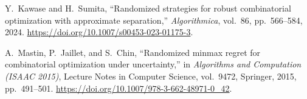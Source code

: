 Y.~Kawase and H.~Sumita, ``Randomized strategies for robust combinatorial
optimization with approximate separation,'' \emph{Algorithmica}, vol.~86,
pp.~566--584, 2024. \url{https://doi.org/10.1007/s00453-023-01175-3}.

A.~Mastin, P.~Jaillet, and S.~Chin, ``Randomized minmax regret for
combinatorial optimization under uncertainty,'' in \emph{Algorithms and
Computation (ISAAC 2015)}, Lecture Notes in Computer Science, vol.~9472,
Springer, 2015, pp.~491--501.
\url{https://doi.org/10.1007/978-3-662-48971-0_42}.

